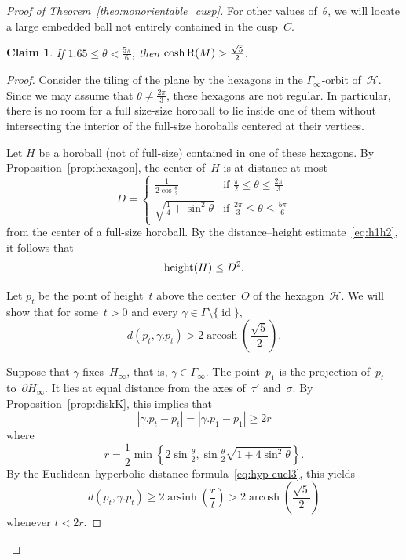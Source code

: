 \documentclass[11pt,reqno]{amsart}
\newtheorem{claim}[theorem]{Claim}
\theoremstyle{definition}
\numberwithin{equation}{section}
\newcommand\RR{{\rm R}}
\DeclareMathOperator{\arsinh}{arsinh}
\DeclareMathOperator{\arcosh}{arcosh}
\DeclareMathOperator{\id}{id}
\DeclareMathOperator{\height}{{\rm height}}
\numberwithin{equation}{section}
\begin{document}
\begin{proof}[Proof of Theorem~\ref{theo:nonorientable_cusp}]
\medskip

For other values of~$\theta$, we will locate a large embedded ball not entirely contained in the cusp~$C$.

\begin{claim} \label{claim:1.65}
If $1.65 \leq \theta < \frac{5\pi}{6}$, then $\cosh \RR(M) > \frac{\sqrt{5}}{2}$.
\end{claim}


\begin{proof}
Consider the tiling of the plane by the hexagons in the $\Gamma_\infty$-orbit of~$\mathcal{H}$.
Since we may assume that $\theta \neq \frac{2\pi}{3}$, these hexagons are not regular.
In particular, there is no room for a full size-size horoball to lie inside one of them without intersecting the interior of the full-size horoballs centered at their vertices.

Let $H$ be a horoball (not of full-size) contained in one of these hexagons.
By Proposition~\ref{prop:hexagon}, the center of~$H$ is at distance at most
\[
D=
\begin{cases}
\frac{1}{2 \cos \frac{\theta}{2}} & \text{if } \frac{\pi}{2} \leq \theta \leq \frac{2\pi}{3} \\
\sqrt{\frac{1}{4} + \sin^2 \theta} & \text{if } \frac{2\pi}{3} \leq \theta \leq \frac{5\pi}{6}
\end{cases}
\]
from the center of a full-size horoball.
By the distance--height estimate~\eqref{eq:h1h2}, it follows that
\begin{equation} \label{eq:heightH}
\height(H) \leq D^2.
\end{equation}

Let $p_t$ be the point of height~$t$ above the center~$O$ of the hexagon~$\mathcal{H}$.
We will show that for some~$t>0$ and every $\gamma \in \Gamma \setminus \{ \id \}$,
\[
d(p_t,\gamma.p_t) > 2 \arcosh \left( \frac{\sqrt{5}}{2} \right).
\]

Suppose that $\gamma$ fixes~$H_\infty$, that is, $\gamma \in \Gamma_\infty$.
The point~$p_1$ is the projection of~$p_t$ to~$\partial H_\infty$.
It lies at equal distance from the axes of~$\tau'$ and~$\sigma$.
By Proposition~\ref{prop:diskK}, this implies that
\[
|\gamma.p_t-p_t| = |\gamma.p_1-p_1| \geq 2r
\]
where
\[
r = \frac{1}{2} \min \left\{ 2 \sin \tfrac{\theta}{2}, \sin \tfrac{\theta}{2} \sqrt{1+4 \sin^2 \theta} \right\}.
\]
By the Euclidean--hyperbolic distance formula~\eqref{eq:hyp-eucl3}, this yields
\begin{equation} \label{eq:gamma1}
d(p_t,\gamma.p_t) \geq 2 \arsinh \left( \frac{r}{t} \right) > 2 \arcosh \left( \frac{\sqrt{5}}{2} \right)
\end{equation}
whenever $t<2r$.


\end{proof}
\end{proof}
\end{document}
